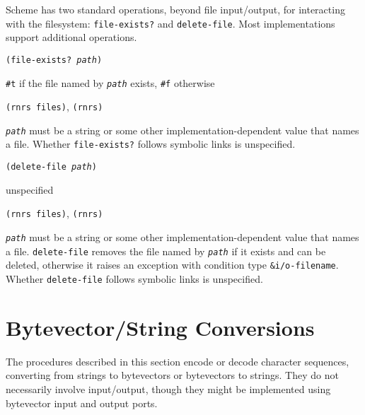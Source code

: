 Scheme has two standard operations, beyond file input/output, for interacting with the
filesystem: \texttt{file-exists?} and \texttt{delete-file}.
Most implementations support additional operations.


\begin{description}

\label{io_s89}\item[procedure] \texttt{(file-exists? \textit{path})}



\item[returns] \texttt{\#{}t} if the file named by \texttt{\textit{path}} exists, \texttt{\#{}f} otherwise


\item[libraries] \texttt{(rnrs files)}, \texttt{(rnrs)}
\end{description}

\texttt{\textit{path}} must be a string or some other implementation-dependent 
value that names a file.
Whether \texttt{file-exists?} follows symbolic links is unspecified.

\begin{description}

\label{io_s90}\item[procedure] \texttt{(delete-file \textit{path})}



\item[returns] unspecified


\item[libraries] \texttt{(rnrs files)}, \texttt{(rnrs)}
\end{description}

\texttt{\textit{path}} must be a string or some other implementation-dependent 
value that names a file.
\texttt{delete-file} removes the file named by \texttt{\textit{path}} if it exists
and can be deleted, otherwise it raises an exception with condition
type \texttt{\&{}i/o-filename}.
Whether \texttt{delete-file} follows symbolic links is unspecified.


\section{\label{io_g132}\label{io_h11}Bytevector/String Conversions\label{io_SECTBSCONVS}}



The procedures described in this section encode or decode character
sequences, converting from strings to bytevectors or bytevectors to
strings.
They do not necessarily involve input/output, though they might be
implemented using bytevector input and output ports.


